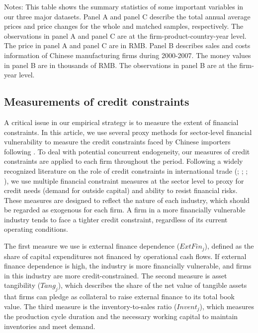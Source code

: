 \documentclass[12pt]{article}
\begin{document}
\begin{table}[htbp]
{\begin{threeparttable}
\begin{tabular}{lcccccc}
		\bottomrule
	\end{tabular}
	\begin{tablenotes}
		\footnotesize
		\item[Notes:] This table shows the summary statistics of some important variables in our three major datasets. Panel A and panel C describe the total annual average prices and price changes for the whole and matched samples, respectively. The observations in panel A and panel C are at the firm-product-country-year level. The price in panel A and panel C are in RMB. Panel B describes sales and costs information of Chinese manufacturing firms during 2000-2007. The money values in panel B are in thousands of RMB. The observations in panel B are at the firm-year level.
	\end{tablenotes}
	\end{threeparttable}
        }
\end{table}

\subsection{Measurements of credit constraints} \label{Measurements-Credit Constraints}

A critical issue in our empirical strategy is to measure the extent of financial constraints. In this article, we use several proxy methods for sector-level financial vulnerability to measure the credit constraints faced by Chinese importers following \cite{manova2013}. To deal with potential concurrent endogeneity, our measures of credit constraints are applied to each firm throughout the period. Following a widely recognized literature on the role of credit constraints in international trade (\cite{kroszner2007}; \cite{manova2013}; \cite{manova-wei-zhang2015}; \cite{fan-lai-li2015}), we use multiple financial constraint measures at the sector level to proxy for credit needs (demand for outside capital) and ability to resist financial risks. These measures are designed to reflect the nature of each industry, which should be regarded as exogenous for each firm. A firm in a more financially vulnerable industry tends to face a tighter credit constraint, regardless of its current operating conditions.

The first measure we use is external finance dependence ($ExtFin_j$), defined as the share of capital expenditures not financed by operational cash flows. If external finance dependence is high, the industry is more financially vulnerable, and firms in this industry are more credit-constrained. The second measure is asset tangibility ($Tang_j$), which describes the share of the net value of tangible assets that firms can pledge as collateral to raise external finance to its total book value. The third measure is the inventory-to-sales ratio ($Invent_j$), which measures the production cycle duration and the necessary working capital to maintain inventories and meet demand. 
\end{document}
